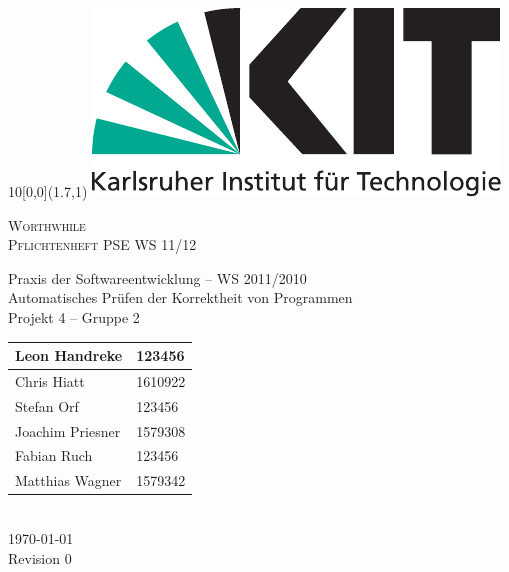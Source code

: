 
\newcommand{\diameter}{20}
\newcommand{\xone}{-30}
\newcommand{\xtwo}{150}
\newcommand{\yone}{15}
\newcommand{\ytwo}{-265}

\begin{titlepage}

	\begin{textblock}{10}[0,0](1.7,1)
		\includegraphics[width=.3\textwidth]{images/kit_logo_de_4c_positiv.pdf}
	\end{textblock}
	\begin{center}
		\fontsize{45}{50}\selectfont
        \vfill
        \textsc{Worthwhile} \\
        \textsc{Pflichtenheft}
        \vfill
		\LARGE
		PSE WS 11/12
  \vfill
 \newpage
 
 \null
 \vfill
 
 Praxis der Softwareentwicklung -- WS 2011/2010 \\
  Automatisches Prüfen der Korrektheit von Programmen \\
  Projekt 4 -- Gruppe 2 \\
  \medskip
  \vspace{2cm}
  \Large
  \begin{tabular}{|l|l|}
    \hline
    Leon Handreke & 123456 \\
    \hline
    Chris Hiatt & 1610922 \\
    \hline
    Stefan Orf & 123456 \\
    \hline
    Joachim Priesner & 1579308 \\
    \hline
    Fabian Ruch & 123456 \\
    \hline
    Matthias Wagner & 1579342 \\
    \hline
  \end{tabular}
  \vspace{2cm} \\
  \today \\
	Revision 0
	\end{center}
	
  \vfill

\end{titlepage}
